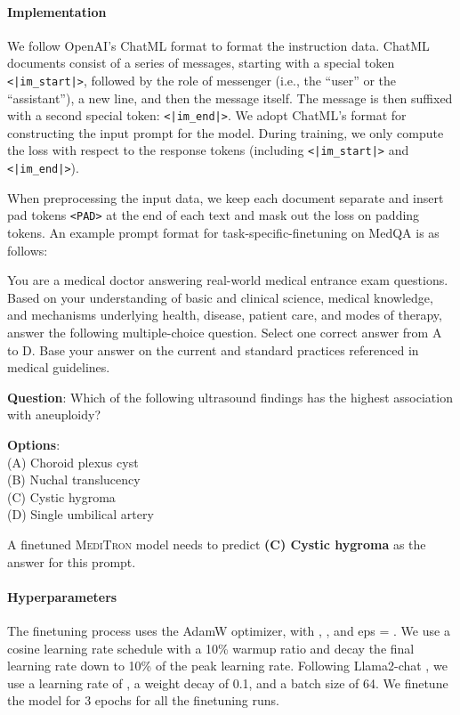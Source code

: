 \documentclass{article}
\newcommand{\llama}{\textnormal{Llama}}
\newcommand{\mtron}{\textsc{MediTron}\xspace}
\begin{document}
\paragraph{Implementation}

We follow OpenAI's ChatML format \citep{OpenAi2023_chatml} to format the instruction data. ChatML documents consist of a series of messages, starting with a special token \texttt{<|im\_start|>}, followed by the role of messenger (i.e., the ``user'' or the ``assistant''), a new line, and then the message itself. The message is then suffixed with a second special token: \texttt{<|im\_end|>}. We adopt ChatML's format for constructing the input prompt for the model. During training, we only compute the loss with respect to the response tokens (including \texttt{<|im\_start|>} and \texttt{<|im\_end|>}). 

When preprocessing the input data, we keep each document separate and insert pad tokens \texttt{<PAD>} at the end of each text and mask out the loss on padding tokens. An example prompt format for task-specific-finetuning on MedQA is as follows:
\begin{myboxnote}


You are a medical doctor answering real-world medical entrance exam questions. Based on your understanding of basic and clinical science, medical knowledge, and mechanisms underlying health, disease, patient care, and modes of therapy, answer the following multiple-choice question. Select one correct answer from A to D. Base your answer on the current and standard practices referenced in medical guidelines. 



{\color{cyan} \textbf{Question}}: Which of the following ultrasound findings has the highest association with aneuploidy?

{\color{purple} \textbf{Options}}: \\
(A) Choroid plexus cyst \\
(B) Nuchal translucency \\
(C) Cystic hygroma \\
(D) Single umbilical artery 


\end{myboxnote}
A finetuned \mtron model needs to predict \textbf{(C) Cystic hygroma} as the answer for this prompt.  

\paragraph{Hyperparameters} The finetuning process uses the AdamW optimizer, with , , and eps = . We use a cosine learning rate schedule with a 10\% warmup ratio and decay the final learning rate down to 10\% of the peak learning rate. Following \llama2-chat \citep{llama2}, we use a learning rate of , a weight decay of 0.1, and a batch size of 64. We finetune the model for 3 epochs for all the finetuning runs. 
\end{document}
